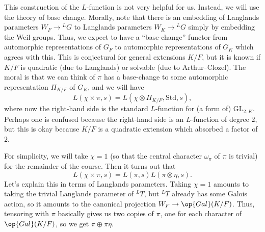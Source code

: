 \documentclass[../notes.tex]{subfiles}
\begin{document}
This construction of the $L$-function is not very helpful for us. Instead, we will use the theory of base change. Morally, note that there is an embedding of Langlands parameters $W_F\to{^LG}$ to Langlands parameters $W_K\to{^LG}$ simply by embedding the Weil groups. Thus, we expect to have a ``base-change'' functor from automorphic representations of $G_F$ to automorphic representations of $G_K$ which agrees with this. This is conjectural for general extensions $K/F$, but it is known if $K/F$ is quadratic (due to Langlands) or solvable (due to Arthur--Clozel). The moral is that we can think of $\pi$ has a base-change to some automorphic representation $\Pi_{K/F}$ of $G_K$, and we will have
\[L(\chi\times\pi,s)=L(\chi\otimes\Pi_{K/F},\mathrm{Std},s),\]
where now the right-hand side is the standard $L$-function for (a form of) $\mathrm{GL}_{2,K}$. Perhaps one is confused because the right-hand side is an $L$-function of degree $2$, but this is okay because $K/F$ is a quadratic extension which absorbed a factor of $2$.

For simplicity, we will take $\chi=1$ (so that the central character $\omega_\pi$ of $\pi$ is trivial) for the remainder of the course. Then it turns out that
\[L(\chi\times\pi,s)=L(\pi,s)L(\pi\otimes\eta,s).\]
Let's explain this in terms of Langlands parameters. Taking $\chi=1$ amounts to taking the trivial Langlands parameter of $^LT$, but $^LT$ already has some Galois action, so it amounts to the canonical projection $W_F\to\op{Gal}(K/F)$. Thus, tensoring with $\pi$ basically gives us two copies of $\pi$, one for each character of $\op{Gal}(K/F)$, so we get $\pi\oplus\pi\eta$.
\end{document}
